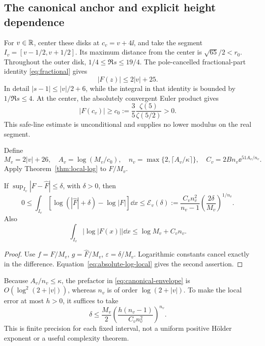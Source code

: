 \subsection{The canonical anchor and explicit height dependence}

For \(v\in\mathbb R\), center these disks at \(c_v=v+4\ii\), and take
the segment \(I_v=[v-1/2,v+1/2]\). Its maximum distance from
the center is \(\sqrt{65}/2<r_0\).
Throughout the outer disk, \(1/4\le\Re s\le19/4\).
The pole-cancelled fractional-part identity
\eqref{eq:fractional} gives
\[
 |F(z)|\le2|v|+25.
\]
In detail \(|s-1|\le |v|/2+6\), while the integral in that
identity is bounded by \(1/\Re s\le4\). At the center,
the absolutely convergent Euler product gives
\begin{equation}\label{eq:canonical-anchor}
 |F(c_v)|\ge c_0:=\frac35\frac{\zeta(5)}{\zeta(5/2)}>0.
\end{equation}
This safe-line estimate is unconditional and supplies no lower
modulus on the real segment.

Define
\begin{equation}\label{eq:local-canonical-constants}
 M_v=2|v|+26,\quad A_v=\log(M_v/c_0),\quad
 n_v=\max\{2,\lceil A_v/\kappa\rceil\},\quad
 C_v=2Bn_v\ee^{51A_v/n_v}.
\end{equation}
Apply Theorem~\ref{thm:local-log} to \(F/M_v\).

\begin{corollary}\label{cor:canonical-log}
If \(\sup_{I_v}|F-\widehat F|\le\delta\), with \(\delta>0\), then
\begin{equation}\label{eq:canonical-envelope}
 0\le\int_{I_v}
 [\log(|\widehat F|+\delta)-\log|F|]\dd x
 \le\mathcal E_v(\delta)
 :=\frac{C_vn_v^2}{n_v-1}
       \left(\frac{2\delta}{M_v}\right)^{1/n_v}.
\end{equation}
Also
\begin{equation}\label{eq:canonical-absolute-log}
 \int_{I_v}|\log|F(x)||\dd x\le\log M_v+C_vn_v.
\end{equation}
\end{corollary}
\begin{proof}
Use \(f=F/M_v\), \(g=\widehat F/M_v\),
\(\varepsilon=\delta/M_v\). Logarithmic constants cancel
exactly in the difference. Equation~\eqref{eq:absolute-log-local}
gives the second assertion.
\end{proof}

Because \(A_v/n_v\le\kappa\), the prefactor in
\eqref{eq:canonical-envelope} is \(O(\log^2(2+|v|))\),
whereas \(n_v\) is of order \(\log(2+|v|)\). To make the local
error at most \(h>0\), it suffices to take
\begin{equation}\label{eq:precision}
 \delta\le\frac{M_v}{2}
 \left(\frac{h(n_v-1)}{C_vn_v^2}\right)^{n_v}.
\end{equation}
This is finite precision for each fixed interval, not a uniform
positive Hölder exponent or a useful complexity theorem.

